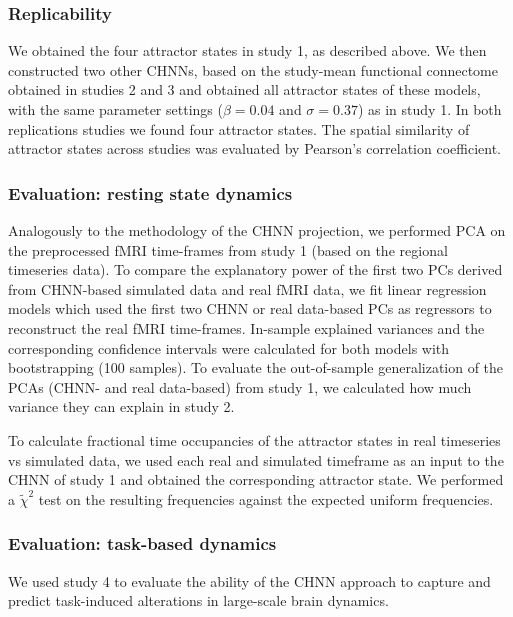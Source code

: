\documentclass{article}
\begin{document}
\subsubsection{Replicability}\label{Replicability}

We obtained the four attractor states in study 1, as described above. We then constructed two other CHNNs, based on the study-mean functional connectome obtained in studies 2 and 3 and  obtained all attractor states of these models, with the same parameter settings ($\beta = 0.04$ and $\sigma = 0.37$) as in study 1. In both replications studies we found four attractor states. The spatial similarity of attractor states across studies was evaluated by Pearson's correlation coefficient.

\subsubsection{Evaluation: resting state dynamics}\label{Evaluation: resting state dynamics}

Analogously to the methodology of the CHNN projection, we performed PCA on the preprocessed fMRI time-frames from study 1 (based on the regional timeseries data).
To compare the explanatory power of the first two PCs derived from CHNN-based simulated data and real fMRI data, we fit linear regression models which used the first two CHNN or real data-based PCs as regressors to reconstruct the real fMRI time-frames. In-sample explained variances and the corresponding confidence intervals were calculated for both models with bootstrapping (100 samples). To evaluate the out-of-sample generalization of the PCAs (CHNN- and real data-based) from study 1, we calculated how much variance they can explain in study 2.

To calculate fractional time occupancies of the attractor states in real timeseries vs simulated data, we used each real and simulated timeframe as an input to the CHNN of study 1 and obtained the corresponding attractor state. We performed a $\tilde{\chi}^2$ test on the resulting frequencies against the expected uniform frequencies.

\subsubsection{Evaluation: task-based dynamics}\label{Evaluation: task-based dynamics}

We used study 4 to evaluate the ability of the CHNN approach to capture and predict task-induced alterations in large-scale brain dynamics.
\end{document}
